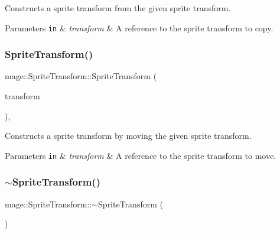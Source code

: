 Constructs a sprite transform from the given sprite transform.


\begin{DoxyParams}[1]{Parameters}
\mbox{\tt in}  & {\em transform} & A reference to the sprite transform to copy. \\
\hline
\end{DoxyParams}
\hypertarget{classmage_1_1_sprite_transform_a320698bf4095c5886256bd17e32a6e3f}{}\label{classmage_1_1_sprite_transform_a320698bf4095c5886256bd17e32a6e3f} 
\subsubsection{\texorpdfstring{Sprite\+Transform()}{SpriteTransform()}\hspace{0.1cm}{\footnotesize\ttfamily [4/4]}}
{\footnotesize\ttfamily mage\+::\+Sprite\+Transform\+::\+Sprite\+Transform (\begin{DoxyParamCaption}\item[{\hyperlink{classmage_1_1_sprite_transform}{Sprite\+Transform} \&\&}]{transform }\end{DoxyParamCaption})\hspace{0.3cm}{\ttfamily [default]}, {\ttfamily [noexcept]}}

Constructs a sprite transform by moving the given sprite transform.


\begin{DoxyParams}[1]{Parameters}
\mbox{\tt in}  & {\em transform} & A reference to the sprite transform to move. \\
\hline
\end{DoxyParams}
\hypertarget{classmage_1_1_sprite_transform_a14a3614023996cbb071c3de99f9528bc}{}\label{classmage_1_1_sprite_transform_a14a3614023996cbb071c3de99f9528bc} 
\subsubsection{\texorpdfstring{$\sim$\+Sprite\+Transform()}{~SpriteTransform()}}
{\footnotesize\ttfamily mage\+::\+Sprite\+Transform\+::$\sim$\+Sprite\+Transform (\begin{DoxyParamCaption}{ }\end{DoxyParamCaption})\hspace{0.3cm}{\ttfamily [default]}}

